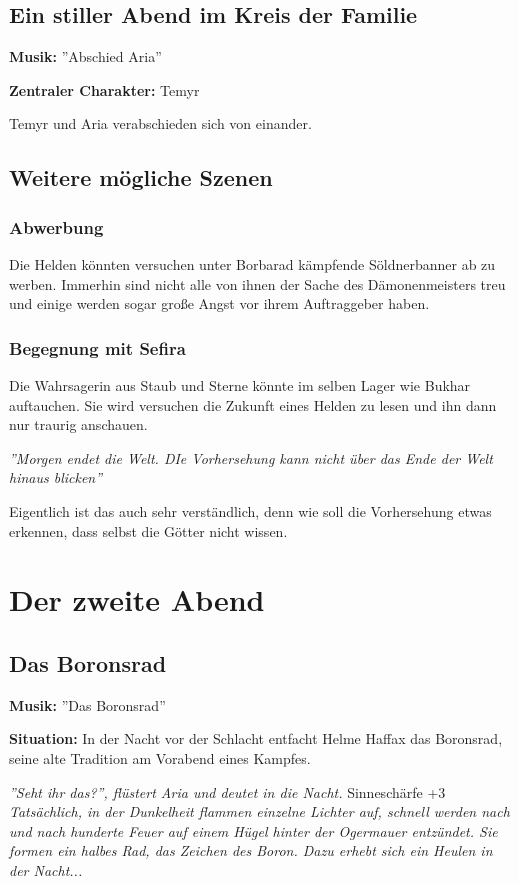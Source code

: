 \subsection{Ein stiller Abend im Kreis der Familie}
\textbf{Musik:} ''Abschied Aria''

\textbf{Zentraler Charakter:} Temyr

Temyr und Aria verabschieden sich von einander.

\subsection{Weitere mögliche Szenen}

\subsubsection{Abwerbung}
Die Helden könnten versuchen unter Borbarad kämpfende Söldnerbanner ab zu werben. Immerhin sind nicht alle von ihnen der Sache des Dämonenmeisters treu und einige werden sogar große Angst vor ihrem Auftraggeber haben.

\subsubsection{Begegnung mit Sefira}
Die Wahrsagerin aus Staub und Sterne könnte im selben Lager wie Bukhar auftauchen. Sie wird versuchen die Zukunft eines Helden zu lesen und ihn dann nur traurig anschauen.

\emph{''Morgen endet die Welt. DIe Vorhersehung kann nicht über das Ende der Welt hinaus blicken''}

Eigentlich ist das auch sehr verständlich, denn wie soll die Vorhersehung etwas erkennen, dass selbst die Götter nicht wissen.


\section{Der zweite Abend}

\subsection{Das Boronsrad}
\textbf{Musik:} ''Das Boronsrad''

\textbf{Situation:} In der Nacht vor der Schlacht entfacht Helme Haffax das Boronsrad, seine alte Tradition am Vorabend eines Kampfes.

\emph{''Seht ihr das?'', flüstert Aria und deutet in die Nacht. } Sinneschärfe +3 \emph{Tatsächlich, in der Dunkelheit flammen einzelne Lichter auf, schnell werden nach und nach hunderte Feuer auf einem Hügel hinter der Ogermauer entzündet. Sie formen ein halbes Rad, das Zeichen des Boron. Dazu erhebt sich ein Heulen in der Nacht...}

